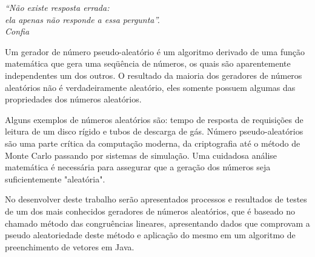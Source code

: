 

	\begin{flushright}
		\textit{``Não existe resposta errada: \\ ela apenas não responde a essa pergunta''.\\
		Confia}
	\end{flushright}
	
	Um gerador de número pseudo-aleatório é um algoritmo derivado de uma função matemática que gera uma seqüência de números, os quais são aparentemente independentes um dos outros. O resultado da maioria dos geradores de números aleatórios não é verdadeiramente aleatório, eles somente possuem algumas das propriedades dos números aleatórios.
	
	Alguns exemplos de números aleatórios são: tempo de resposta de requisições de leitura de um disco rígido e tubos de descarga de gás. Número pseudo-aleatórios são uma parte crítica da computação moderna, da criptografia até o método de Monte Carlo passando por sistemas de simulação. Uma cuidadosa análise matemática é necessária para assegurar que a geração dos números seja suficientemente "aleatória"\cite{wiki1}.
	
	No desenvolver deste trabalho serão apresentados processos e resultados de testes de um dos mais conhecidos geradores de números aleatórios, que é baseado no chamado método das congruências lineares, apresentando dados que comprovam a pseudo aleatoriedade deste método e aplicação do mesmo em um algoritmo de preenchimento de vetores em Java.